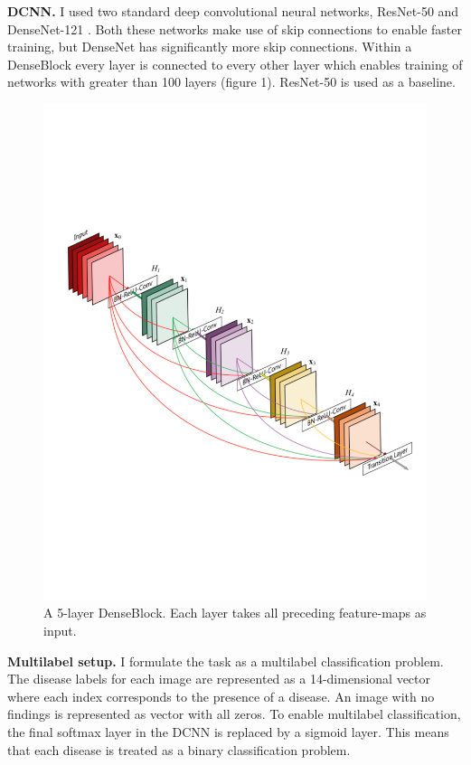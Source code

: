 \documentclass{article}
\begin{document}
{\bf DCNN.} I used two standard deep convolutional neural networks, ResNet-50 and DenseNet-121 \cite{He,Huang}. Both these networks make use of skip connections to enable faster training, but DenseNet has significantly more skip connections. Within a DenseBlock every layer is connected to every other layer which enables training of networks with greater than 100 layers (figure 1). ResNet-50 is used as a baseline.

\begin{figure}[ht]
\vskip 0.2in
\begin{center}
\centerline{\includegraphics[width=\columnwidth]{figure_1}}
\caption{A 5-layer DenseBlock. Each layer takes all preceding feature-maps as input.}
\label{figure 1:}
\end{center}
\vskip -0.2in
\end{figure}

{\bf Multilabel setup.} I formulate the task as a multilabel classification problem. The disease labels for each image are represented as a 14-dimensional vector where each index corresponds to the presence of a disease. An image with no findings is represented as vector with all zeros. To enable multilabel classification, the final softmax layer in the DCNN is replaced by a sigmoid layer. This means that each disease is treated as a binary classification problem.
\end{document}
